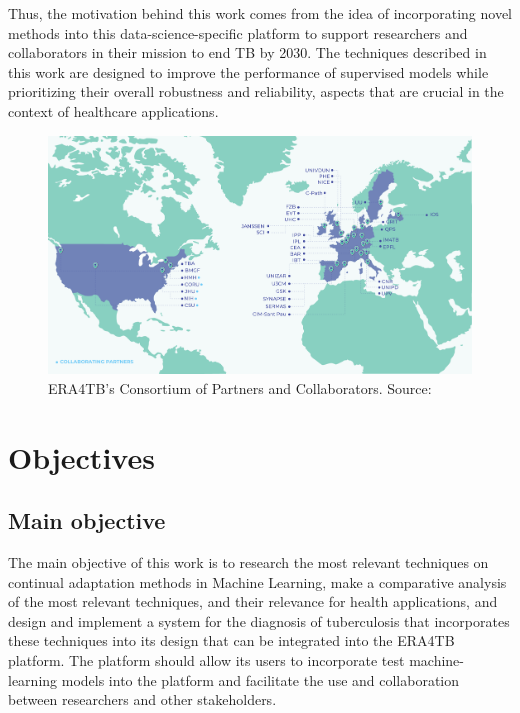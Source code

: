 \documentclass[../main.tex]{subfiles}
\begin{document}
    Thus, the motivation behind this work comes from the idea of incorporating novel methods into this data-science-specific platform to support researchers and collaborators in their mission to end TB by 2030. The techniques described in this work are designed to improve the performance of supervised models while prioritizing their overall robustness and reliability, aspects that are crucial in the context of healthcare applications.

    \begin{figure}[H]
        \centering
        \includegraphics[width=\textwidth]{figures/ERA4TB_map.png}
        \caption{ERA4TB's Consortium of Partners and Collaborators. Source: \cite{noauthor_era4tb}}
        \label{fig:era4tb}
    \end{figure}

    \section{Objectives} \label{sec:objectives}

    \subsection*{Main objective} \label{sec:main_goal}

    The main objective of this work is to research the most relevant techniques on continual adaptation methods in Machine Learning, make a comparative analysis of the most relevant techniques, and their relevance for health applications, and design and implement a system for the diagnosis of tuberculosis that incorporates these techniques into its design that can be integrated into the ERA4TB platform. The platform should allow its users to incorporate test machine-learning models into the platform and facilitate the use and collaboration between researchers and other stakeholders.
\end{document}
